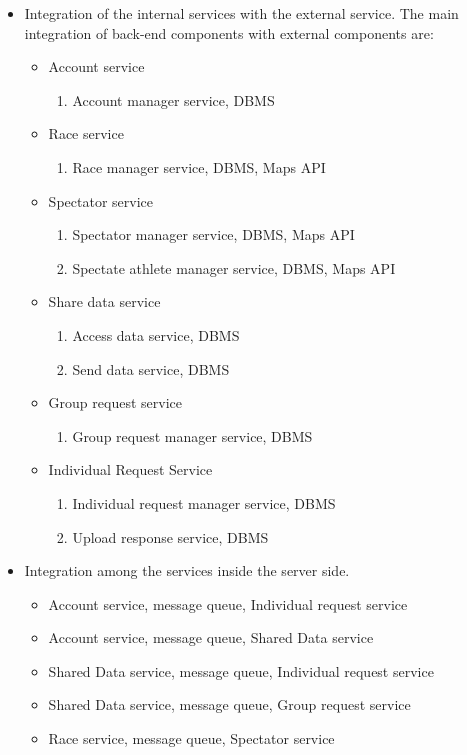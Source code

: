 \begin{itemize}
\item Integration of the internal services with the external service.
The main integration of back-end components with external components are: 
\begin{itemize}
\item Account service
\begin{enumerate}
\item Account manager service, DBMS
\end{enumerate}
\item Race service
\begin{enumerate}
\item Race manager service, DBMS, Maps API
\end{enumerate}
\item Spectator service
\begin{enumerate}
\item Spectator manager service, DBMS, Maps API
\item Spectate athlete manager service, DBMS, Maps API
\end{enumerate}
\item Share data service
\begin{enumerate}
\item Access data service, DBMS
\item Send data service, DBMS
\end{enumerate}
\item Group request service
\begin{enumerate}
\item Group request manager service, DBMS
\end{enumerate}
\item Individual Request Service
\begin{enumerate}
\item Individual request manager service, DBMS
\item Upload response service, DBMS
\end{enumerate}
\end{itemize}
\item Integration among the services inside the server side.  
\begin{itemize}
\item Account service, message queue, Individual request service
\item Account service, message queue, Shared Data service
\item Shared Data service, message queue, Individual request service
\item Shared Data service, message queue, Group request service
\item Race service, message queue, Spectator service
\end{itemize}
\end{itemize}
